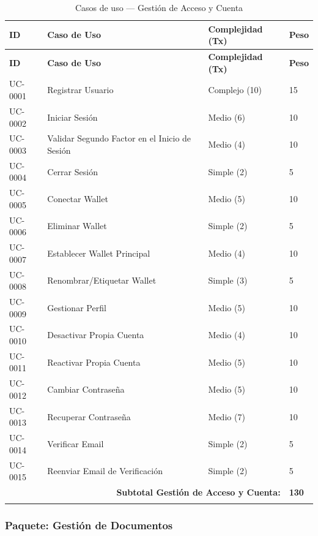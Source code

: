 \documentclass[11pt, a4paper]{article}
\begin{document}
\begin{longtable}{|p{1.8cm}|p{6.5cm}|p{3cm}|p{1.5cm}|}
\hline
\textbf{ID} & \textbf{Caso de Uso} & \textbf{Complejidad (Tx)} & \textbf{Peso} \\
\hline
\endfirsthead
\hline
\textbf{ID} & \textbf{Caso de Uso} & \textbf{Complejidad (Tx)} & \textbf{Peso} \\
\hline
\endhead
UC-0001 & Registrar Usuario & Complejo (10) & 15 \\
\hline
UC-0002 & Iniciar Sesión & Medio (6) & 10 \\
\hline
UC-0003 & Validar Segundo Factor en el Inicio de Sesión & Medio (4) & 10 \\
\hline
UC-0004 & Cerrar Sesión & Simple (2) & 5 \\
\hline
UC-0005 & Conectar Wallet & Medio (5) & 10 \\
\hline
UC-0006 & Eliminar Wallet & Simple (2) & 5 \\
\hline
UC-0007 & Establecer Wallet Principal & Medio (4) & 10 \\
\hline
UC-0008 & Renombrar/Etiquetar Wallet & Simple (3) & 5 \\
\hline
UC-0009 & Gestionar Perfil & Medio (5) & 10 \\
\hline
UC-0010 & Desactivar Propia Cuenta & Medio (4) & 10 \\
\hline
UC-0011 & Reactivar Propia Cuenta & Medio (5) & 10 \\
\hline
UC-0012 & Cambiar Contraseña & Medio (5) & 10 \\
\hline
UC-0013 & Recuperar Contraseña & Medio (7) & 10 \\
\hline
UC-0014 & Verificar Email & Simple (2) & 5 \\
\hline
UC-0015 & Reenviar Email de Verificación & Simple (2) & 5 \\
\hline
\multicolumn{3}{|r|}{\textbf{Subtotal Gestión de Acceso y Cuenta:}} & \textbf{130} \\
\hline
\caption{Casos de uso --- Gestión de Acceso y Cuenta}
\end{longtable}

\subsubsection*{Paquete: Gestión de Documentos}
\end{document}
